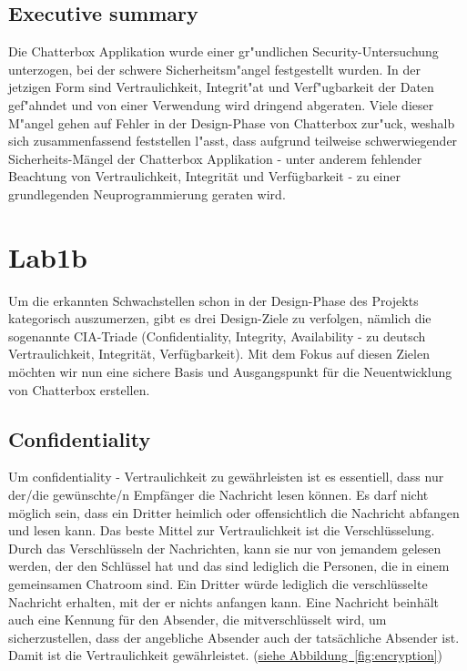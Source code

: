 \documentclass[12pt,a4paper,titlepage,oneside]{scrartcl}
\begin{document}
\subsection{Executive summary}
Die Chatterbox Applikation wurde einer gr"undlichen Security-Untersuchung unterzogen, bei der schwere Sicherheitsm"angel festgestellt wurden. In der jetzigen Form sind Vertraulichkeit, Integrit"at und Verf"ugbarkeit der Daten gef"ahndet und von einer Verwendung wird dringend abgeraten. Viele dieser M"angel gehen auf Fehler in der Design-Phase von Chatterbox zur"uck, weshalb sich zusammenfassend feststellen l"asst, dass aufgrund teilweise schwerwiegender Sicherheits-Mängel der Chatterbox Applikation - unter anderem fehlender Beachtung von Vertraulichkeit, Integrität und Verfügbarkeit - zu einer grundlegenden Neuprogrammierung geraten wird.

\section{Lab1b}

Um die erkannten Schwachstellen schon in der Design-Phase des Projekts kategorisch auszumerzen, gibt es drei Design-Ziele zu verfolgen, n\"amlich die sogenannte CIA-Triade (Confidentiality, Integrity, Availability - zu deutsch Vertraulichkeit, Integrit\"at, Verf\"ugbarkeit). Mit dem Fokus auf diesen Zielen m\"ochten wir nun eine sichere Basis und Ausgangspunkt f\"ur die Neuentwicklung von Chatterbox erstellen.

\subsection{Confidentiality}
Um confidentiality - Vertraulichkeit zu gew\"ahrleisten ist es essentiell, dass nur der/die gew\"unschte/n Empf\"anger die Nachricht lesen k\"onnen. Es darf nicht m\"oglich sein, dass ein Dritter heimlich oder offensichtlich die Nachricht abfangen und lesen kann. Das beste Mittel zur Vertraulichkeit ist die Verschl\"usselung. Durch das Verschl\"usseln der Nachrichten, kann sie nur von jemandem gelesen werden, der den Schl\"ussel hat und das sind lediglich die Personen, die in einem gemeinsamen Chatroom sind. Ein Dritter w\"urde lediglich die verschl\"usselte Nachricht erhalten, mit der er nichts anfangen kann. Eine Nachricht beinh\"alt auch eine Kennung f\"ur den Absender, die mitverschl\"usselt wird, um sicherzustellen, dass der angebliche Absender auch der tats\"achliche Absender ist. Damit ist die Vertraulichkeit gew\"ahrleistet. (\hyperref[fig:encryption]{siehe Abbildung~\ref*{fig:encryption}})
\end{document}
